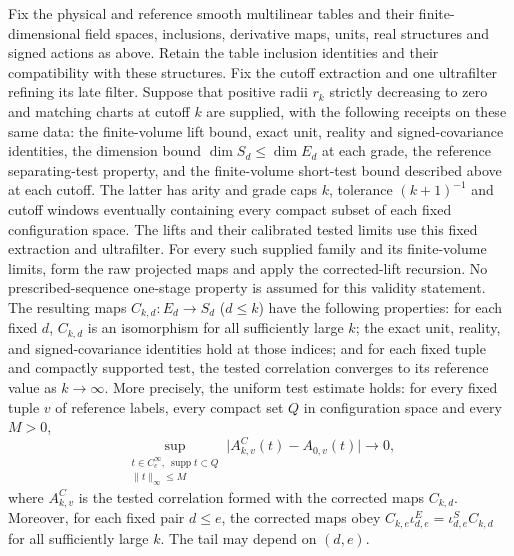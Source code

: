 \begin{theorem}
\label{thm:ex-lattice-selected-trace-gallery}
Fix the physical and reference smooth multilinear tables and their
finite-dimensional field spaces, inclusions, derivative maps, units,
real structures and signed actions as above. Retain the table inclusion
identities and their compatibility with these structures. Fix the cutoff
extraction and one ultrafilter refining its late filter. Suppose that
positive radii $r_k$ strictly decreasing to zero and matching charts at
cutoff $k$ are supplied, with the following receipts on these same data:
the finite-volume lift bound, exact unit, reality and signed-covariance
identities, the dimension bound $\dim S_d\le\dim E_d$ at each grade,
the reference separating-test property, and the finite-volume short-test
bound described above at each cutoff. The latter has arity and grade caps
$k$, tolerance $(k+1)^{-1}$ and cutoff windows eventually containing every
compact subset of each fixed configuration space. The lifts and their
calibrated tested limits use this fixed extraction and ultrafilter.
For every such supplied family and its finite-volume limits, form the raw
projected maps and apply the corrected-lift recursion. No
prescribed-sequence one-stage property is assumed for this validity
statement.
The resulting maps $C_{k,d}:E_d\to S_d$
($d\le k$) have the following properties:
for each fixed $d$, $C_{k,d}$ is an isomorphism for all sufficiently large
$k$; the exact unit, reality, and signed-covariance identities hold at those
indices; and for each fixed tuple and compactly supported test, the tested
correlation converges to its reference value as $k\to\infty$.  More
precisely, the uniform test estimate holds: for every fixed tuple $v$ of
reference labels, every compact set $Q$ in configuration space and every
$M>0$,
\begin{equation}\label{eq:ex-lattice-trace-uniform-tests}
 \sup_{\substack{t\in C_c^\infty,\ \operatorname{supp}t\subset Q\\
                 \|t\|_\infty\le M}}
 \bigl|A^C_{k,v}(t)-A_{0,v}(t)\bigr|\longrightarrow0,
\end{equation}
where $A^C_{k,v}$ is the tested correlation formed with the corrected maps
$C_{k,d}$. Moreover,
for each fixed pair $d\le e$, the corrected maps obey
$C_{k,e}\iota^E_{d,e}=\iota^S_{d,e}C_{k,d}$ for all sufficiently large
$k$. The tail may depend on $(d,e)$.
\end{theorem}
